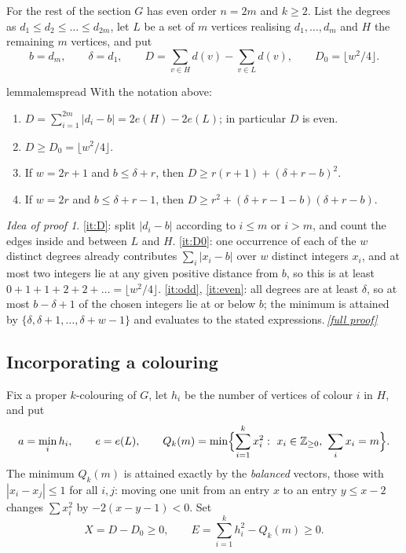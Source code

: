 \documentclass[11pt,a4paper]{article}
\theoremstyle{plain}
\theoremstyle{definition}
\theoremstyle{remark}
\newtheorem*{proofidea}{Idea of proof}
\newcommand{\fullproofref}[1]{\,\hyperref[#1]{\textit{[full proof]}}}
\providecommand{\tightlist}{\setlength{\itemsep}{0pt}\setlength{\parskip}{0pt}}
\newcommand{\Z}{\mathbb Z}
\newcommand{\fl}[1]{\lfloor #1\rfloor}
\begin{document}
For the rest of the section $G$ has even order $n=2m$ and $k\ge2$. List the degrees as $d_1\le d_2\le\dots\le d_{2m}$, let $L$ be a set of $m$ vertices realising $d_1,\dots,d_m$ and $H$ the remaining $m$ vertices, and put
\[
b=d_m,\qquad \delta=d_1,\qquad D=\sum_{v\in H}d(v)-\sum_{v\in L}d(v),\qquad D_0=\fl{w^2/4}.
\]

\begin{restatable}{lemma}{lemspread}\label{lem:spread}
With the notation above:
\begin{enumerate}[label=(\alph*)]\tightlist
\item\label{it:D} $D=\sum_{i=1}^{2m}|d_i-b|=2e(H)-2e(L)$; in particular $D$ is even.
\item\label{it:D0} $D\ge D_0=\fl{w^2/4}$.
\item\label{it:odd} If $w=2r+1$ and $b\le\delta+r$, then $D\ge r(r+1)+(\delta+r-b)^2$.
\item\label{it:even} If $w=2r$ and $b\le\delta+r-1$, then $D\ge r^2+(\delta+r-1-b)(\delta+r-b)$.
\end{enumerate}
\end{restatable}

\begin{proofidea}
\ref{it:D}: split $|d_i-b|$ according to $i\le m$ or $i>m$, and count the edges inside and between $L$ and $H$. \ref{it:D0}: one occurrence of each of the $w$ distinct degrees already contributes $\sum_i|x_i-b|$ over $w$ distinct integers $x_i$, and at most two integers lie at any given positive distance from $b$, so this is at least $0+1+1+2+2+\dots=\fl{w^2/4}$. \ref{it:odd}, \ref{it:even}: all degrees are at least $\delta$, so at most $b-\delta+1$ of the chosen integers lie at or below $b$; the minimum is attained by $\{\delta,\delta+1,\dots,\delta+w-1\}$ and evaluates to the stated expressions.\fullproofref{pf:spread}
\end{proofidea}

\subsection{Incorporating a colouring}

Fix a proper $k$-colouring of $G$, let $h_i$ be the number of vertices of colour $i$ in $H$, and put
\[
a=\min_i h_i,\qquad e=e(L),\qquad Q_k(m)=\min\Bigl\{\sum_{i=1}^k x_i^2:\ x_i\in\Z_{\ge0},\ \sum_i x_i=m\Bigr\}.
\]
The minimum $Q_k(m)$ is attained exactly by the \emph{balanced} vectors, those with $|x_i-x_j|\le1$ for all $i,j$: moving one unit from an entry $x$ to an entry $y\le x-2$ changes $\sum x_i^2$ by $-2(x-y-1)<0$. Set
\[
X=D-D_0\ge0,\qquad E=\sum_{i=1}^k h_i^2-Q_k(m)\ge0 .
\]
\end{document}
